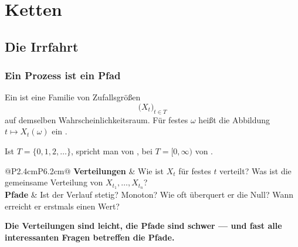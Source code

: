 \part{Ketten}

\chapter{Die Irrfahrt}

\section{Ein Prozess ist ein Pfad}

\begin{definition}
Ein  ist eine Familie von Zufallsgrößen
\[ \bigl(X_t\bigr)_{t \in T} \]
auf demselben Wahrscheinlichkeitsraum. Für festes $\omega$ heißt die Abbildung $t \mapsto X_t(\omega)$ ein .

Ist $T = \{0,1,2,\ldots\}$, spricht man von , bei $T = [0,\infty)$ von .
\end{definition}

\begin{merksatz}
\begin{center}
{\small
\renewcommand{\arraystretch}{1.52}
\begin{tabular}{@{}P{2.4cm}P{6.2cm}@{}}
\toprule
\textbf{Verteilungen} & Wie ist $X_t$ für festes $t$ verteilt? Was ist die gemeinsame Verteilung von $X_{t_1},\ldots,X_{t_n}$?\\
\textbf{Pfade} & Ist der Verlauf stetig? Monoton? Wie oft überquert er die Null? Wann erreicht er erstmals einen Wert?\\
\bottomrule
\end{tabular}}
\end{center}

\begin{center}
\begin{minipage}{0.9\textwidth}
\textbf{Die Verteilungen sind leicht, die Pfade sind schwer --- und fast alle interessanten Fragen betreffen die Pfade.}
\end{minipage}
\end{center}

\begin{center}
\begin{minipage}{0.88\textwidth}
\end{minipage}
\end{center}
\end{merksatz}

